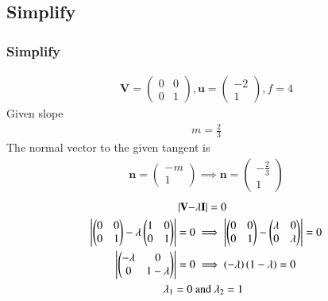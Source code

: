 \documentclass{beamer}
\providecommand{\brak}[1]{\ensuremath{\left(#1\right)}}
\theoremstyle{remark}
\newcommand{\myvec}[1]{\ensuremath{\begin{pmatrix}#1\end{pmatrix}}}
\let\vec\mathbf
\numberwithin{equation}{section}
\begin{document}
\subsection{Simplify}
\begin{frame}
\frametitle{Simplify}
\begin{align}
\vec{V}=\myvec{0&0\\0&1},\vec{u}=\myvec{-2\\1},f=4
\end{align}
Given slope
\begin{align}
    m=\frac{2}{3}
\end{align}
The normal vector to the given tangent is 
\begin{align}
    \vec{n}=\myvec{-m\\1} \implies \vec{n}=\myvec{-\frac{2}{3}\\1} 
    \end{align}
    \begin{align}
    |\vec{V}-& \lambda\vec{I}|=0 \\
    \mydet{\myvec{0&0\\0&1}-\lambda\myvec{1&0\\0&1}}=0 &\implies
    \mydet{\myvec{0&0\\0&1}-\myvec{\lambda&0\\0&\lambda}}=0\\
    \mydet{\myvec{-\lambda&0\\0&1-\lambda}}=0 &\implies \brak{-\lambda}\brak{1-\lambda}=0 \\
    \lambda_1=0\ &\text{and}\ \lambda_2=1
\end{align}
 \end{frame}
\end{document}
